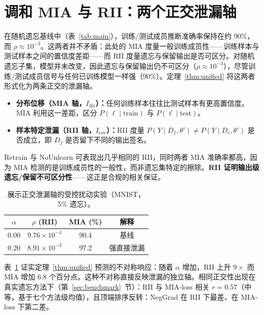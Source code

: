 
\section{调和 MIA 与 RII：两个正交泄漏轴}
\label{sec:mia}

在随机遗忘基线中（表~\ref{tab:main}），训练/测试成员推断准确率保持在约 90\%，而 $\rho \approx 10^{-3}$。这两者并不矛盾：此处的 MIA 度量一般训练成员性——训练样本与测试样本之间的置信度差距——而 RII 度量遗忘与保留输出是否可区分。对随机遗忘子集，模型并未改变，因此遗忘与保留输出仍不可区分（$\rho\approx10^{-3}$），尽管训练/测试成员信号与任何已训练模型一样强（90\%）。定理~\ref{thm:unified} 将这两者形式化为两条正交的泄漏轴。

\begin{itemize}
\item \textbf{分布位移（MIA 轴，$I_{\mathrm{dir}}$）：}任何训练样本往往比测试样本有更高置信度。MIA 利用这一差距，区分 $P(\ell\mid\text{train})$ 与 $P(\ell\mid\text{test})$。
\item \textbf{样本特定泄漏（RII 轴，$I_{\mathrm{cov}}$）：}RII 度量 $P(Y\mid D_f,\theta') \neq P(Y\mid D_r,\theta')$ 是否成立，即 $D_f$ 是否留下不同的输出签名。
\end{itemize}

Retrain 与 NoUnlearn 可表现出几乎相同的 RII，同时两者 MIA 准确率都高，因为 MIA 检测的是训练成员性的一般性，而非遗忘集特定的擦除。\textbf{RII 证明输出级遗忘/保留不可区分性}——这正是合规的相关保证。

\begin{table}[t]
\centering
\caption{展示正交泄漏轴的受控扰动实验（MNIST，5\% 遗忘）。}\label{tab:alpha}
\setlength{\tabcolsep}{3pt}
\begin{tabular}{c c c c}
\toprule
$\alpha$ & $\rho$ (RII) & MIA (\%) & 解释 \\
\midrule
0.00 & $9.76{\times}10^{-4}$ & 90.4 & 基线 \\
0.20 & $8.91{\times}10^{-3}$ & 97.2 & 强直接泄漏 \\
\bottomrule
\end{tabular}
\end{table}

表~\ref{tab:alpha} 证实定理~\ref{thm:unified} 预测的不对称响应：随着 $\alpha$ 增加，RII 上升 $9\times$ 而 MIA 增加 6.8 个百分点。这种不对称直接反映泄漏的独立轴。相同正交性出现在真实遗忘方法下（第~\ref{sec:benchmark}~节）：RII 与 MIA-loss 相关 $r{=}0.57$（中等，基于七个方法级均值），且顶端排序反转：NegGrad 在 RII 下最差、在 MIA-loss 下第二差。

